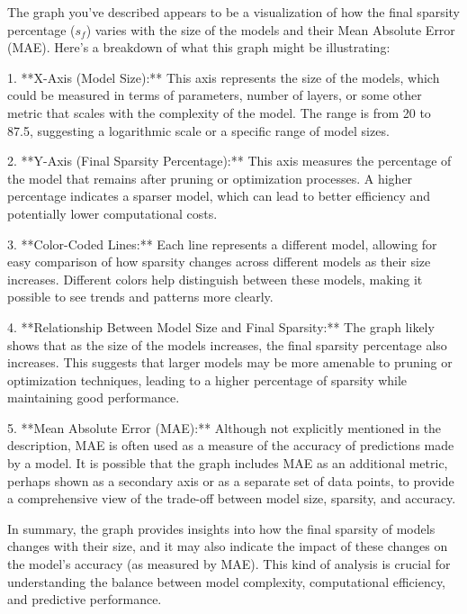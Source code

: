 The graph you've described appears to be a visualization of how the final sparsity percentage (\( s_f \)) varies with the size of the models and their Mean Absolute Error (MAE). Here's a breakdown of what this graph might be illustrating:

1. **X-Axis (Model Size):** This axis represents the size of the models, which could be measured in terms of parameters, number of layers, or some other metric that scales with the complexity of the model. The range is from 20 to 87.5, suggesting a logarithmic scale or a specific range of model sizes.

2. **Y-Axis (Final Sparsity Percentage):** This axis measures the percentage of the model that remains after pruning or optimization processes. A higher percentage indicates a sparser model, which can lead to better efficiency and potentially lower computational costs.

3. **Color-Coded Lines:** Each line represents a different model, allowing for easy comparison of how sparsity changes across different models as their size increases. Different colors help distinguish between these models, making it possible to see trends and patterns more clearly.

4. **Relationship Between Model Size and Final Sparsity:** The graph likely shows that as the size of the models increases, the final sparsity percentage also increases. This suggests that larger models may be more amenable to pruning or optimization techniques, leading to a higher percentage of sparsity while maintaining good performance.

5. **Mean Absolute Error (MAE):** Although not explicitly mentioned in the description, MAE is often used as a measure of the accuracy of predictions made by a model. It is possible that the graph includes MAE as an additional metric, perhaps shown as a secondary axis or as a separate set of data points, to provide a comprehensive view of the trade-off between model size, sparsity, and accuracy.

In summary, the graph provides insights into how the final sparsity of models changes with their size, and it may also indicate the impact of these changes on the model's accuracy (as measured by MAE). This kind of analysis is crucial for understanding the balance between model complexity, computational efficiency, and predictive performance.